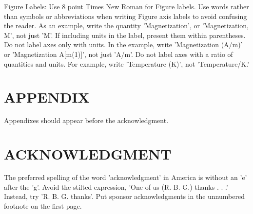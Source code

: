 \documentclass[letterpaper, 10 pt, conference]{ieeeconf}  %
\begin{document}
Figure Labels: Use 8 point Times New Roman for Figure labels. Use words rather than symbols or abbreviations when writing Figure axis labels to avoid confusing the reader. As an example, write the quantity 'Magnetization', or 'Magnetization, M', not just 'M'. If including units in the label, present them within parentheses. Do not label axes only with units. In the example, write 'Magnetization (A/m)' or 'Magnetization {A[m(1)]}', not just 'A/m'. Do not label axes with a ratio of quantities and units. For example, write 'Temperature (K)', not 'Temperature/K.'

\addtolength{\textheight}{-12cm}   %







\section*{APPENDIX}

Appendixes should appear before the acknowledgment.

\section*{ACKNOWLEDGMENT}

The preferred spelling of the word 'acknowledgment' in America is without an 'e' after the 'g'. Avoid the stilted expression, 'One of us (R. B. G.) thanks . . .'  Instead, try 'R. B. G. thanks'. Put sponsor acknowledgments in the unnumbered footnote on the first page.



\end{document}
